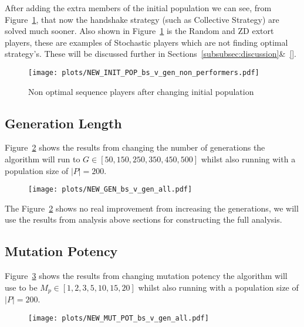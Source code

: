 After adding the extra members of the initial population we can see, from Figure~\ref{fig:NEW-INIT-POP-bs-v-gen-non-performers}, that now the handshake strategy (such as Collective Strategy) are solved much sooner.
Also shown in Figure~\ref{fig:NEW-INIT-POP-bs-v-gen-non-performers} is the Random and ZD extort players, these are examples of Stochastic players which are not finding optimal strategy's.
These will be discussed further in Sections~\ref{subsubsec:discussion}\&~\ref{}.
\begin{figure}[h]
    \texttt{[image: plots/NEW\_INIT\_POP\_bs\_v\_gen\_non\_performers.pdf]}
    \caption{Non optimal sequence players after changing initial population}\label{fig:NEW-INIT-POP-bs-v-gen-non-performers}
\end{figure}

\subsection{Generation Length}\label{subsec:generationLength}
Figure~\ref{fig:NEW-GEN-bs-v-gen-all} shows the results from changing the number of generations the algorithm will run to \(G \in [50,150,250,350,450,500] \) whilst also running with a population size of \(|P|=200\).

\begin{figure}[h]
    \texttt{[image: plots/NEW\_GEN\_bs\_v\_gen\_all.pdf]}
    \caption{}\label{fig:NEW-GEN-bs-v-gen-all}
\end{figure}

The Figure~\ref{fig:NEW-GEN-bs-v-gen-all} shows no real improvement from increasing the generations, we will use the results from analysis above sections for constructing the full analysis.

\subsection{Mutation Potency}\label{subsec:mutationPotency}
Figure~\ref{fig:NEW-MUT-POT-bs-v-gen-all} shows the results from changing mutation potency the algorithm will use to be \(M_p \in [1,2,3,5,10,15,20] \) whilst also running with a population size of \(|P|=200\).

\begin{figure}[h]
    \texttt{[image: plots/NEW\_MUT\_POT\_bs\_v\_gen\_all.pdf]}
    \caption{}\label{fig:NEW-MUT-POT-bs-v-gen-all}
\end{figure}

